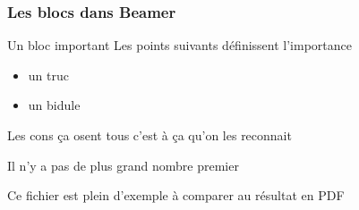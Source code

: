 
\begin{frame}[fragile]
  \frametitle{Les blocs dans Beamer}

  
  \begin{block}{Un bloc important}
    Les points suivants définissent l'importance

    \begin{itemize}
    \item un truc
    \item un bidule
    \end{itemize}
    
  \end{block}



  \begin{definition}
    Les cons ça osent tous c'est à ça qu'on les reconnait
  \end{definition}

  \begin{theorem}
    Il n'y a pas de plus grand nombre premier
  \end{theorem}

  \begin{example}
    Ce fichier est plein d'exemple à comparer au résultat en PDF
  \end{example}
\end{frame}


